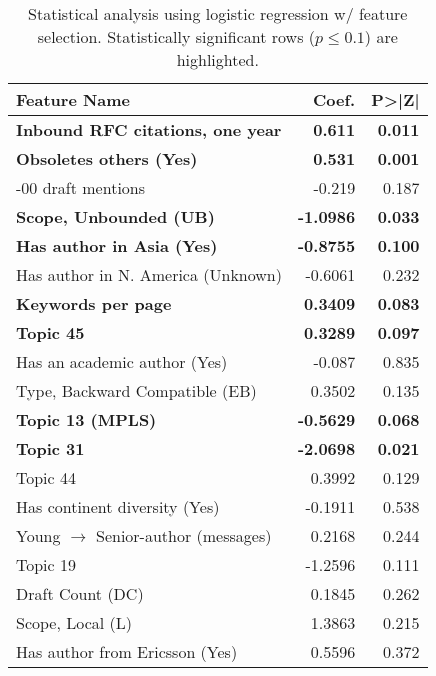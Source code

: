 \begin{table}
\centering
\begin{tabular}{lrr}
\toprule
Feature Name & Coef. & P>|Z| \\
\midrule
\textbf{Inbound RFC citations, one year} & \textbf{0.611} & \textbf{0.011} \\
\textbf{Obsoletes others (Yes)} & \textbf{0.531} & \textbf{0.001} \\
-00 draft mentions & -0.219 & 0.187 \\
\textbf{Scope, Unbounded (UB)} & \textbf{-1.0986} & \textbf{0.033} \\
\textbf{Has author in Asia (Yes)} & \textbf{-0.8755} & \textbf{0.100} \\
Has author in N. America (Unknown) & -0.6061 & 0.232 \\
\textbf{Keywords per page} & \textbf{0.3409} & \textbf{0.083} \\
\textbf{Topic 45} & \textbf{0.3289} & \textbf{0.097} \\
Has an academic author (Yes) & -0.087 & 0.835 \\
Type, Backward Compatible (EB) & 0.3502 & 0.135 \\
\textbf{Topic 13 (MPLS)} & \textbf{-0.5629} & \textbf{0.068} \\
\textbf{Topic 31} & \textbf{-2.0698} & \textbf{0.021} \\
Topic 44 & 0.3992 & 0.129 \\
Has continent diversity (Yes) & -0.1911 & 0.538 \\
Young $\rightarrow$ Senior-author (messages) & 0.2168 & 0.244 \\
Topic 19 & -1.2596 & 0.111 \\
Draft Count (DC) & 0.1845 & 0.262 \\
Scope, Local (L) & 1.3863 & 0.215 \\
Has author from Ericsson (Yes) & 0.5596 & 0.372 \\
\bottomrule
\end{tabular}
\caption{Statistical analysis using logistic regression w/ feature selection. Statistically significant rows ($p \leq 0.1$) are highlighted.}
\label{tbl:statsfs}
\end{table}
